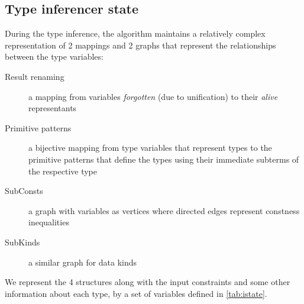 \subsection{Type inferencer state}
\label{sec:istate}

During the type inference, the algorithm maintains a relatively complex representation of 2 mappings and 2 graphs that represent the relationships between the type variables:

\begin{description}
    \item[Result renaming] a mapping from variables \emph{forgotten} (due to unification) to their \emph{alive} representants
    \item[Primitive patterns] a bijective mapping from type variables that represent types to the primitive patterns that define the types using their immediate subterms of the respective type
    \item[SubConsts] a graph with variables as vertices where directed edges represent constness inequalities
    \item[SubKinds] a similar graph for data kinds
\end{description}

We represent the 4 structures along with the input constraints and some other information about each type, by a set of variables defined in \cref{tab:istate}.

